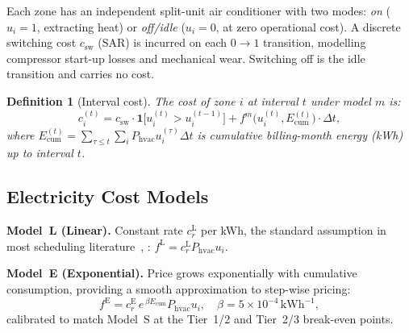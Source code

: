 \documentclass[3p,number]{elsarticle}
\let\oldsubsection\subsection
\renewcommand{\subsection}{\FloatBarrier\oldsubsection}
\newtheorem{definition}{Definition} \newtheorem{proposition}{Proposition} \newtheorem{remark}{Remark} \newtheorem{observation}{Observation}
\newcommand{\csw}{c_{\mathrm{sw}}}
\newcommand{\Phvac}{P_{\mathrm{hvac}}}
\begin{document}
Each zone has an independent split-unit air conditioner with two modes: \emph{on} ($u_i=1$, extracting heat) or \emph{off/idle} ($u_i=0$, at zero operational cost).
A discrete switching cost $\csw$ (SAR) is incurred on each $0\to1$ transition, modelling compressor start-up losses and mechanical wear.
Switching off is the idle transition and carries no cost.
 
\begin{definition}[Interval cost]
\label{def:interval_cost}
The cost of zone $i$ at interval $t$ under model $m$ is:
\begin{equation}
  c_i^{(t)} = \csw\cdot\mathbf{1}\!\bigl[u_i^{(t)}>u_i^{(t-1)}\bigr]
             + f^m\!\bigl(u_i^{(t)},E_{\mathrm{cum}}^{(t)}\bigr)\cdot\Delta t,
  \label{eq:interval_cost}
\end{equation}
where $E_{\mathrm{cum}}^{(t)}=\sum_{\tau\le t}\!\sum_i\Phvac u_i^{(\tau)}\Delta t$
is cumulative billing-month energy (kWh) up to interval $t$.
\end{definition}
 
\subsection{Electricity Cost Models}
\label{subsec:costmodels}
 
\textbf{Model~L (Linear).}
Constant rate $c_r^{\mathrm{L}}$ per kWh, the standard assumption in most scheduling literature~\cite{ElMakroum2023}, \cite{Gonçalves2022}: $f^{\mathrm{L}}=c_r^{\mathrm{L}}\Phvac u_i$.
 
\textbf{Model~E (Exponential).}
Price grows exponentially with cumulative consumption, providing a smooth approximation to step-wise pricing:
\begin{equation}
  f^{\mathrm{E}}=c_r^{\mathrm{E}}\,e^{\,\beta E_{\mathrm{cum}}}
  \Phvac u_i,\quad \beta=5\times10^{-4}\,\text{kWh}^{-1},
  \label{eq:exp}
\end{equation}
calibrated to match Model~S at the Tier~1/2 and Tier~2/3 break-even points.
 
\end{document}
